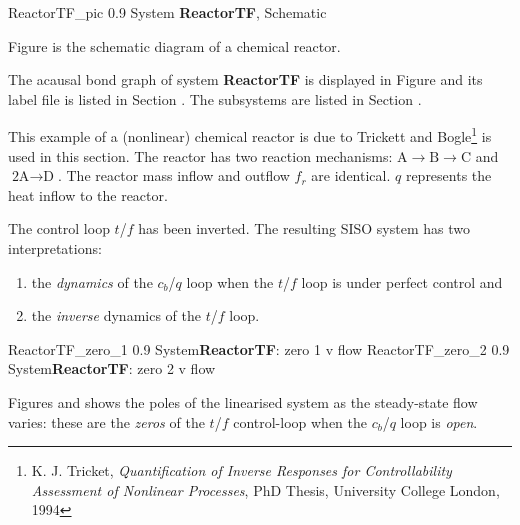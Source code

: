 

{ReactorTF_pic} {0.9} {System \textbf{ReactorTF}, Schematic}

Figure  is the schematic diagram of a chemical
reactor.

The acausal bond graph of system \textbf{ReactorTF} is displayed in
Figure  and its label file is listed in
Section .  The subsystems are listed in Section
.

This example of a (nonlinear) chemical reactor is due to Trickett and
Bogle\footnote{ K. J. Tricket, \emph{Quantification of Inverse
    Responses for Controllability Assessment of Nonlinear Processes},
  PhD Thesis, University College London, 1994} is used in this
section.  The reactor has two reaction mechanisms: $\text{A}
\rightarrow \text{B} \rightarrow \text{C}$ and $\text{2A} \rightarrow
\text{D}$.  The reactor mass inflow and outflow $f_r$ are identical.
$q$ represents the heat inflow to the reactor.

The control loop $t$/$f$ has been inverted. The resulting SISO
system has two interpretations:
\begin{enumerate}
\item the \emph{dynamics} of the $c_b$/$q$ loop when the $t$/$f$ loop
  is under perfect control and
\item the \emph{inverse} dynamics of the  $t$/$f$ loop.
\end{enumerate}

 {ReactorTF_zero_1} {0.9}
{System\textbf{ReactorTF}: zero 1 v flow} 
 {ReactorTF_zero_2} {0.9}
{System\textbf{ReactorTF}: zero 2 v flow} 

Figures  and 
shows the poles of the linearised system as the steady-state flow
varies: these are the \emph{zeros} of the $t$/$f$ control-loop when
the $c_b$/$q$ loop is \emph{open}.


